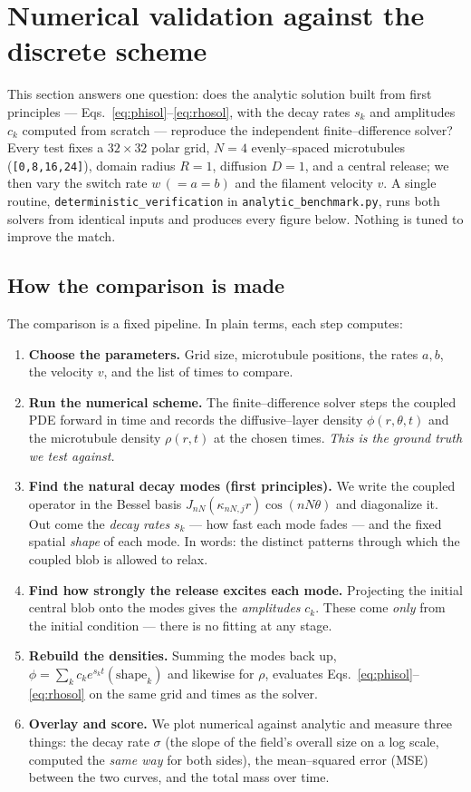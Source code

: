 \documentclass{article}
\begin{document}
\section{Numerical validation against the discrete scheme}
\label{sec:validation}

This section answers one question: does the analytic solution built from first
principles --- Eqs.~\eqref{eq:phisol}--\eqref{eq:rhosol}, with the decay rates
$s_k$ and amplitudes $c_k$ computed from scratch --- reproduce the independent
finite--difference solver? Every test fixes a $32\times32$ polar grid, $N=4$
evenly--spaced microtubules (\texttt{[0,8,16,24]}), domain radius $R=1$, diffusion
$D=1$, and a central release; we then vary the switch rate $w\,(=a=b)$ and the
filament velocity $v$. A single routine, \texttt{deterministic\_verification} in
\texttt{analytic\_benchmark.py}, runs both solvers from identical inputs and
produces every figure below. Nothing is tuned to improve the match.

\subsection{How the comparison is made}

The comparison is a fixed pipeline. In plain terms, each step computes:

\begin{enumerate}
\item \textbf{Choose the parameters.} Grid size, microtubule positions, the rates
$a,b$, the velocity $v$, and the list of times to compare.
\item \textbf{Run the numerical scheme.} The finite--difference solver steps the
coupled PDE forward in time and records the diffusive--layer density
$\phi(r,\theta,t)$ and the microtubule density $\rho(r,t)$ at the chosen times.
\emph{This is the ground truth we test against.}
\item \textbf{Find the natural decay modes (first principles).} We write the
coupled operator in the Bessel basis $J_{nN}(\kappa_{nN,j}r)\cos(nN\theta)$ and
diagonalize it. Out come the \emph{decay rates} $s_k$ --- how fast each mode fades
--- and the fixed spatial \emph{shape} of each mode. In words: the distinct
patterns through which the coupled blob is allowed to relax.
\item \textbf{Find how strongly the release excites each mode.} Projecting the
initial central blob onto the modes gives the \emph{amplitudes} $c_k$. These come
\emph{only} from the initial condition --- there is no fitting at any stage.
\item \textbf{Rebuild the densities.} Summing the modes back up,
$\phi=\sum_k c_k e^{s_k t}(\text{shape}_k)$ and likewise for $\rho$, evaluates
Eqs.~\eqref{eq:phisol}--\eqref{eq:rhosol} on the same grid and times as the solver.
\item \textbf{Overlay and score.} We plot numerical against analytic and measure
three things: the decay rate $\sigma$ (the slope of the field's overall size on a
log scale, computed the \emph{same way} for both sides), the mean--squared error
(MSE) between the two curves, and the total mass over time.
\end{enumerate}
\end{document}

